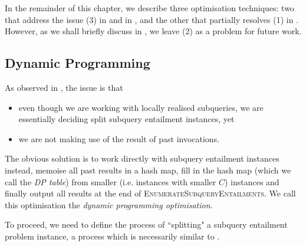 \documentclass[12pt]{report}
\theoremstyle{plain}
\theoremstyle{definition}
\begin{document}
In the remainder of this chapter, we describe three optimisation techniques: two that address the issue (3) in  and in , and the other that partially resolves (1) in . However, as we shall briefly discuss in , we leave (2) as a problem for future work.

\subsection{Dynamic Programming}
\label{subsection:dp-optimisation}

As observed in , the issue is that
\begin{itemize}
  \item even though we are working with locally realised subqueries, we are essentially deciding split subquery entailment instances, yet
  \item we are not making use of the result of past invocations.
\end{itemize}

The obvious solution is to work directly with subquery entailment instances instead, memoise all past results in a hash map, fill in the hash map (which we call the \emph{DP table}) from smaller (i.e. instances with smaller $C$) instances and finally output all results at the end of \textsc{EnumerateSubqueryEntailments}. We call this optimisation the \emph{dynamic programming optimisation}.

To proceed, we need to define the process of ``splitting" a subquery entailment problem instance, a process which is necessarily similar to .
\end{document}

